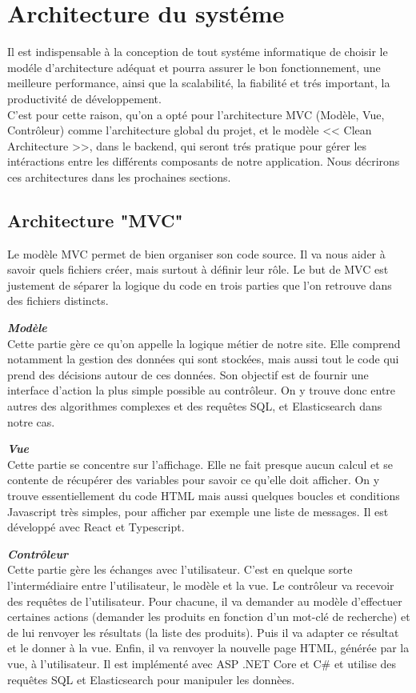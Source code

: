 \section{Architecture du systéme}
\noindent
Il est indispensable à la conception de tout systéme informatique de choisir le modéle d'architecture adéquat et pourra assurer le bon fonctionnement, une meilleure performance, ainsi que la scalabilité, la fiabilité et trés important, la productivité de développement. \\
C'est pour cette raison, qu'on a opté pour l'architecture MVC (Modèle, Vue, Contrôleur) comme l'architecture global du projet, et le modèle << Clean Architecture >>, dans le backend, qui seront trés pratique pour gérer les intéractions entre les différents composants de notre application. Nous décrirons ces architectures dans les prochaines sections.

\subsection{Architecture "MVC"}
\noindent
Le modèle MVC permet de bien organiser son code source. Il va nous aider à savoir quels fichiers créer, mais surtout à définir leur rôle. Le but de MVC est justement de séparer la logique du code en trois parties que l'on retrouve dans des fichiers distincts.

\noindent
{\small\textbf{\textit{Modèle}}}\mbox{}\\
Cette partie gère ce qu'on appelle la logique métier de notre site. Elle comprend notamment la gestion des données qui sont stockées, mais aussi tout le code qui prend des décisions autour de ces données. Son objectif est de fournir une interface d'action la plus simple possible au contrôleur. On y trouve donc entre autres des algorithmes complexes et des requêtes SQL, et Elasticsearch dans notre cas.

\noindent
{\small\textbf{\textit{Vue}}}\mbox{}\\
Cette partie se concentre sur l'affichage. Elle ne fait presque aucun calcul et se contente de récupérer des variables pour savoir ce qu'elle doit afficher. On y trouve essentiellement du code HTML mais aussi quelques boucles et conditions Javascript très simples, pour afficher par exemple une liste de messages. Il est développé avec React et Typescript.

\noindent
{\small\textbf{\textit{Contrôleur}}}\mbox{}\\
Cette partie gère les échanges avec l'utilisateur. C'est en quelque sorte l'intermédiaire entre l'utilisateur, le modèle et la vue. Le contrôleur va recevoir des requêtes de l'utilisateur. Pour chacune, il va demander au modèle d'effectuer certaines actions (demander les produits en fonction d'un mot-clé de recherche) et de lui renvoyer les résultats (la liste des produits). Puis il va adapter ce résultat et le donner à la vue. Enfin, il va renvoyer la nouvelle page HTML, générée par la vue, à l'utilisateur. Il est implémenté avec ASP .NET Core et C\# et utilise des requêtes SQL et Elasticsearch pour manipuler les donnèes.

